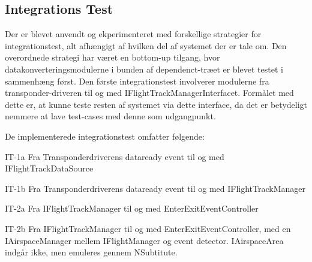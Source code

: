 
\subsection{Integrations Test}

Der er blevet anvendt og ekperimenteret med forskellige strategier for integrationstest, alt afhængigt af hvilken del af systemet der er tale om.
Den overordnede strategi har været en bottom-up tilgang, hvor datakonverteringsmodulerne i bunden af dependenct-træet er blevet testet i sammenhæng først. Den første integrationstest involverer modulerne fra transponder-driveren til og med IFlightTrackManagerInterfacet. 
Formålet med dette er, at kunne teste resten af systemet via dette interface, da det er betydeligt nemmere at lave test-cases med denne som udgangpunkt.

De implementerede integrationstest omfatter følgende:

 IT-1a  Fra Transponderdriverens dataready event til og med IFlightTrackDataSource

 IT-1b  Fra Transponderdriverens dataready event til og med IFlightTrackManager

 IT-2a  Fra IFlightTrackManager til og med EnterExitEventController

 IT-2b  Fra IFlightTrackManager til og med EnterExitEventController, med en IAirspaceManager mellem IFlightManager og event detector. IAirspaceArea indgår ikke, men emuleres gennem NSubtitute.